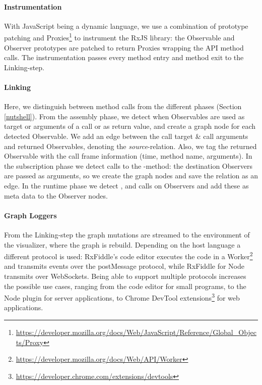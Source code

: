 \paragraph{Instrumentation}
With JavaScript being a dynamic language, we use a combination of prototype patching and Proxies\footnote{\url{https://developer.mozilla.org/docs/Web/JavaScript/Reference/Global_Objects/Proxy}} to instrument the RxJS library: the Observable and Observer prototypes are patched to return Proxies wrapping the API method calls. The instrumentation passes every method entry and method exit to the Linking-step.

\paragraph{Linking}
Here, we distinguish between method calls from the different phases (Section \ref{nutshell}). From the assembly phase, we detect when Observables are used as target or arguments of a call or as return value, and create a graph node for each detected Observable. We add an edge between the call target \& call arguments and returned Observables, denoting the \emph{source}-relation. Also, we tag the returned Observable with the call frame information (time, method name, arguments). In the subscription phase we detect calls to the -method: the destination Observers are passed as arguments, so we create the graph nodes and save the relation as an edge. In the runtime phase we detect ,  and  calls on Observers and add these as meta data to the Observer nodes.

\paragraph{Graph Loggers}
From the Linking-step the graph mutations are streamed to the environment of the visualizer, where the graph is rebuild. Depending on the host language a different protocol is used: RxFiddle's code editor executes the code in a Worker\footnote{\url{https://developer.mozilla.org/docs/Web/API/Worker}} and transmits events over the postMessage protocol, while RxFiddle for Node transmits over WebSockets. Being able to support multiple protocols increases the possible use cases, ranging from the code editor for small programs, to the Node plugin for server applications, to Chrome DevTool extensions\footnote{\url{https://developer.chrome.com/extensions/devtools}} for web applications.

